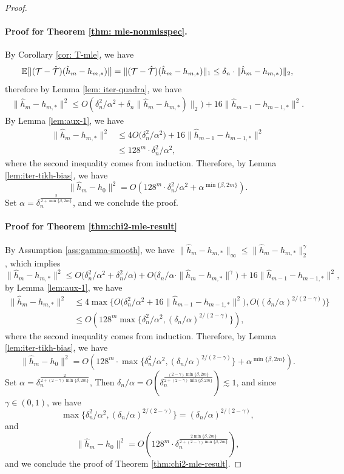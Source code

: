 \begin{proof}
\paragraph{Proof for Theorem \ref{thm: mle-nonmisspec}.}
By Corollary \ref{cor: T-mle}, we have $$
\mathbb{E}[|({\mathcal{T}} - \hat{{\mathcal{T}}})(\hat{h}_{m} - h_{m,*})|] = \|({\mathcal{T}} - \hat{{\mathcal{T}}})(\hat{h}_{m} - h_{m,*})\|_1 \leq \delta_{n}\cdot\|\hat{h}_{m} - h_{m,*})\|_2,
$$
therefore by Lemma \ref{lem: iter-quadra}, we have \begin{align*}
    \|\hat{h}_{m} - h_{m,*}\|^2 \leq O(\delta_n^2/\alpha^2 + \delta_n\|\hat{h}_{m} - h_{m,*})\|_2)+ 16 \|\hat{h}_{m-1} - h_{m-1,*}\|^2. 
\end{align*}
By Lemma \ref{lem:aux-1}, we have \begin{align*}
    \|\hat{h}_m - h_{m,*}\|^2 &\leq 4O\big(\delta_n^2/\alpha^2\big) + 16\|\hat{h}_{m-1} - h_{m-1,*}\|^2 \\
&\leq 128^m\cdot\delta_n^2/\alpha^2,
\end{align*}
where the second inequality comes from induction. Therefore, by Lemma \ref{lem:iter-tikh-bias}, we have $$
\|\hat{h}_m - h_{0}\|^2 =O(128^m\cdot\delta_n^2/\alpha^2 + \alpha^{\min\{\beta, 2m\}}).
$$
Set $\alpha = \delta_n^{\frac{2}{2+\min\{\beta, 2m\}}}$, and we conclude the proof.
\paragraph{Proof for Theorem \ref{thm:chi2-mle-result}}
By Assumption \ref{ass:gamma-smooth}, we have $\|\hat{h}_{m} - h_{m,*}\|_\infty \leq\|\hat{h}_{m} - h_{m,*}\|_2^\gamma $, which implies $$
\|\hat{h}_{m} - h_{m,*}\|^2 \leq O\big(\delta_n^2/\alpha^2 + \delta_n^2 /\alpha
\big) + O\bigg({\delta_n}/{\alpha} \cdot\|\hat{h}_{m} - h_{m,*}\|^\gamma\bigg)+ 16\|\hat{h}_{m-1} - h_{m-1,*}\|^2,
$$
by Lemma \ref{lem:aux-1}, we have \begin{align*}
    \|\hat{h}_{m} - h_{m,*}\|^2 &\leq 4\max\big\{O\big(\delta_n^2/\alpha^2 + 16\|\hat{h}_{m-1} - h_{m-1,*}\|^2 
\big), O\big((\delta_n/\alpha)^{2/(2-\gamma)}\big)\big\}\\
&\leq O(128^m \max\big\{\delta_n^2/\alpha^2, (\delta_n/\alpha)^{2/(2-\gamma)}\big\}),
\end{align*}
where the second inequality comes from induction.  Therefore, by Lemma \ref{lem:iter-tikh-bias}, we have $$
\|\hat{h}_m - h_{0}\|^2 =O(128^m\cdot\max\big\{\delta_n^2/\alpha^2, (\delta_n/\alpha)^{2/(2-\gamma)}\big\} + \alpha^{\min\{\beta, 2m\}}).
$$
Set $\alpha = \delta_n^{\frac{2}{2+ (2-\gamma)\min\{\beta, 2m\}}}$, Then $\delta_n / \alpha = O(\delta_n^{\frac{(2-\gamma)\min\{\beta, 2m\}}{2+ (2-\gamma)\min\{\beta, 2m\}}}) \lesssim 1$, and since $\gamma \in (0,1)$, we have $$
\max\big\{\delta_n^2/\alpha^2, (\delta_n/\alpha)^{2/(2-\gamma)}\big\} = (\delta_n/\alpha)^{2/(2-\gamma)},
$$
and $$
\|\hat{h}_m - h_{0}\|^2 = O(128^m \cdot \delta_n^{\frac{2\min\{\beta, 2m\}}{2+ (2-\gamma)\min\{\beta, 2m\}}}),
$$
and we conclude the proof of Theorem \ref{thm:chi2-mle-result}.
\end{proof}


